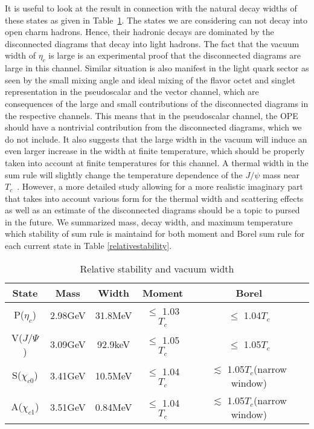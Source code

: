 \documentclass[aps,prc,superscriptaddress,showpacs,floatfix, nofootinbib,preprintnumbers,twocolumn]{revtex4}
\begin{document}
It is useful to look at the result in connection with the natural decay widths of these states as given in Table~\ref{width}.  The states we are considering can not decay into open charm hadrons.  Hence, their hadronic decays are dominated by the disconnected diagrams that decay into light hadrons.  The fact that the vacuum width of $\eta_c$ is large is an experimental proof that the disconnected diagrams are large in this channel.    
Similar situation is also manifest in the light quark sector as seen by the 
small mixing angle and ideal mixing of the flavor octet and singlet representation in the pseudoscalar and the vector channel, which are  consequences of the large and small contributions of the disconnected diagrams in the respective channels.    This means that in the pseudoscalar channel, the OPE should have a nontrivial contribution from the disconnected diagrams, which we do not include.  It also suggests that the large width in the vacuum will induce an even larger increase in the width at finite temperature, which should be properly taken into account at finite temperatures for this channel. 
A thermal width in the sum rule will slightly change the temperature dependence of the $J/\psi$ mass near $T_c$~\cite{Morita:2009qk}.   
However, a more detailed study allowing for a more realistic imaginary part that takes into account various form for the thermal width and scattering effects as well as an estimate of the disconnected diagrams should be a topic to pursed in the future.  
We summarized mass, decay width, and maximum temperature which stability of sum rule is maintaind for both moment and Borel sum rule for each current state in Table \ref{relativestability}.


\begin{table}[h]
\caption{Relative stability and vacuum width}
\label{relativestability}
\centering
\begin{scriptsize}
\begin{tabular}{ |c|c|c|c|c| }
 \hline
         State& Mass &Width& Moment & Borel\\
 \hline
P($\eta_c$)& 2.98GeV& 31.8MeV&$\leq$ 1.03$T_c$&$\leq$ 1.04$T_c$ \\ 
 \hline
 V($J/\Psi$)&3.09GeV&92.9keV&$\leq$ 1.05$T_c$&$\leq$ 1.05$T_c$ \\ 
 \hline
S($\chi_{c0}$)& 3.41GeV&10.5MeV& $\leq$ 1.04$T_c$&$\lesssim$ 1.05$T_c$(narrow window)\\ 
 \hline
A($\chi_{c1}$)& 3.51GeV&0.84MeV& $\leq$ 1.04$T_c$&$\lesssim$ 1.05$T_c$(narrow window)\\ 
 \hline
\end{tabular}
\end{scriptsize}
\label{width}
\end{table}
\end{document}
